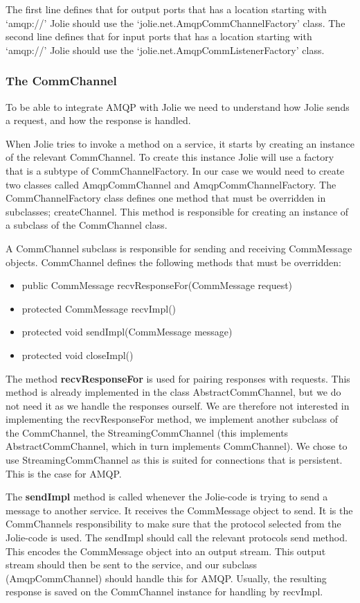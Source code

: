 The first line defines that for output ports that has a location starting with `amqp://' Jolie should use the `jolie.net.AmqpCommChannelFactory' class.
The second line defines that for input ports that has a location starting with `amqp://' Jolie should use the `jolie.net.AmqpCommListenerFactory' class.

\subsubsection{The CommChannel}
To be able to integrate AMQP with Jolie we need to understand how Jolie sends a request, and how the response is handled.

When Jolie tries to invoke a method on a service, it starts by creating an instance of the relevant CommChannel. To create this instance Jolie will use a factory that is a subtype of CommChannelFactory. In our case we would need to create two classes called AmqpCommChannel and AmqpCommChannelFactory. The CommChannelFactory class defines one method that must be overridden in subclasses; createChannel. This method is responsible for creating an instance of a subclass of the CommChannel class.

A CommChannel subclass is responsible for sending and receiving CommMessage objects. CommChannel defines the following methods that must be overridden:
\begin{itemize}
  \item public CommMessage recvResponseFor(CommMessage request)
  \item protected CommMessage recvImpl()
  \item protected void sendImpl(CommMessage message)
  \item protected void closeImpl()
\end{itemize}

The method \textbf{recvResponseFor} is used for pairing responses with requests. This method is already implemented in the class AbstractCommChannel, but we do not need it as we handle the responses ourself. We are therefore not interested in implementing the recvResponseFor method, we implement another subclass of the CommChannel, the StreamingCommChannel (this implements AbstractCommChannel, which in turn implements CommChannel). We chose to use StreamingCommChannel as this is suited for connections that is persistent. This is the case for AMQP.

The \textbf{sendImpl} method is called whenever the Jolie-code is trying to send a message to another service. It receives the CommMessage object to send. It is the CommChannels responsibility to make sure that the protocol selected from the Jolie-code is used. The sendImpl should call the relevant protocols send method. This encodes the CommMessage object into an output stream. This output stream should then be sent to the service, and our subclass (AmqpCommChannel) should handle this for AMQP. Usually, the resulting response is saved on the CommChannel instance for handling by recvImpl.

